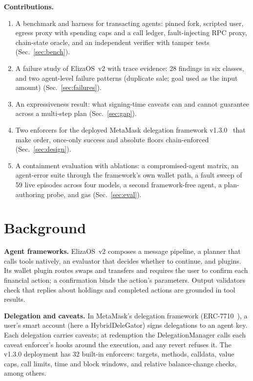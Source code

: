 \documentclass[conference]{IEEEtran}
\begin{document}
\textbf{Contributions.}
\begin{enumerate}
\item A benchmark and harness for transacting agents: pinned fork, scripted user, egress proxy with spending caps and
a call ledger, fault-injecting RPC proxy, chain-state oracle, and an independent verifier with tamper tests
(Sec.~\ref{sec:bench}).
\item A failure study of ElizaOS~v2 with trace evidence: 28 findings in six classes, and two agent-level failure
patterns (duplicate sale; goal used as the input amount) (Sec.~\ref{sec:failures}).
\item An expressiveness result: what signing-time caveats can and cannot guarantee across a multi-step plan
(Sec.~\ref{sec:gap}).
\item Two enforcers for the deployed MetaMask delegation framework v1.3.0~\cite{metamaskdelegation,erc7710}
that make order, once-only success and absolute floors chain-enforced (Sec.~\ref{sec:design}).
\item A containment evaluation with ablations: a compromised-agent matrix, an agent-error suite through the
framework's own wallet path, a fault sweep of 59 live episodes across four models, a second framework-free agent, a
plan-authoring probe, and gas (Sec.~\ref{sec:eval}).
\end{enumerate}

\section{Background}

\textbf{Agent frameworks.} ElizaOS~v2 composes a message pipeline, a planner that calls tools natively, an
evaluator that decides whether to continue, and plugins. Its wallet plugin routes swaps and transfers and requires
the user to confirm each financial action; a confirmation binds the action's parameters. Output validators check
that replies about holdings and completed actions are grounded in tool results.

\textbf{Delegation and caveats.} In MetaMask's delegation framework (ERC-7710~\cite{erc7710}), a user's smart account
(here a HybridDeleGator) signs delegations to an agent key. Each delegation carries caveats; at redemption the
DelegationManager calls each caveat enforcer's hooks around the execution, and any revert refuses it. The v1.3.0
deployment has 32 built-in enforcers: targets, methods, calldata, value caps, call limits, time and block windows, and
relative balance-change checks, among others.
\end{document}
